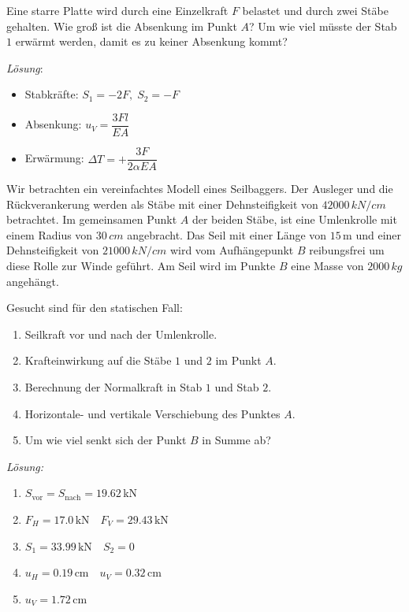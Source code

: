 \begin{example}
	Eine starre Platte wird durch eine Einzelkraft $F$ belastet und durch zwei Stäbe gehalten.
	Wie groß ist die Absenkung im Punkt $A$?
	Um wie viel müsste der Stab $1$ erwärmt werden, damit es zu keiner Absenkung kommt?
	\begin{center}
		
	\end{center}
	
	\textit{Lösung}:
	\begin{itemize}
		\item Stabkräfte: $S_1 = -2F,\;S_2 = -F$ 
		\item Absenkung: $u_V = \dfrac{3Fl}{EA}$ 
		\item Erwärmung: $\Delta T = +\dfrac{3F}{2\alpha EA}$
	\end{itemize}	
\end{example}


\begin{example}
	Wir betrachten ein vereinfachtes Modell eines Seilbaggers.
	Der Ausleger und die Rückverankerung werden als Stäbe mit einer Dehnsteifigkeit von $\unit{42000\,kN/cm}$ betrachtet.
	Im gemeinsamen Punkt $A$ der beiden Stäbe, ist eine Umlenkrolle mit einem Radius von $\unit{30\,cm}$ angebracht.
	Das Seil mit einer  Länge von $15\,$m und einer  Dehnsteifigkeit von $\unit{21000\,kN/cm}$ wird  vom Aufhängepunkt $B$ reibungsfrei um diese Rolle zur Winde geführt.
	Am Seil wird im Punkte $B$ eine Masse von $\unit{2000\,kg}$ angehängt.  
	\begin{center}
		
	\end{center}
	Gesucht sind für den statischen Fall:
	\begin{enumerate}[1)]
		\item Seilkraft vor und nach der Umlenkrolle.
		\item Krafteinwirkung auf die Stäbe $1$ und $2$ im Punkt $A$.
		\item Berechnung der Normalkraft in Stab $1$ und Stab $2$.
		\item Horizontale- und vertikale Verschiebung des Punktes $A$.
		\item Um wie viel senkt sich der Punkt $B$ in Summe ab?
	\end{enumerate}

	\textit{Lösung:}
	\begin{enumerate}[1)]
		\item $S_\text{vor}=S_\text{nach}=19.62\,$kN
		\item $F_H=17.0\,\text{kN} \quad F_V=29.43\,\text{kN}$
		\item $S_1=33.99\,\text{kN} \quad S_2=0$
		\item $u_H=0.19\,\text{cm} \quad u_V=0.32\,\text{cm}$
		\item $u_V=1.72\,\text{cm}$
	\end{enumerate}
\end{example}
